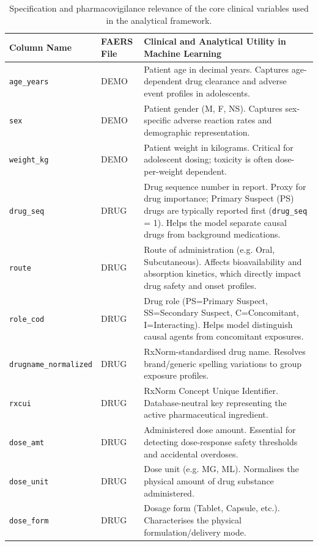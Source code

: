 \documentclass[10pt]{article}
\begin{document}
\begin{table}[htbp]
\caption{Specification and pharmacovigilance relevance of the core clinical variables used in the analytical framework.}
\label{tab:features_spec}
\centering\small\setlength{\tabcolsep}{8pt}
\begin{tabularx}{\textwidth}{|l|l|>{\raggedright\arraybackslash}X|}
\hline
\textbf{Column Name} &
\textbf{FAERS File} &
\textbf{Clinical and Analytical Utility in Machine Learning}\\
\hline
\texttt{age\_years} & DEMO & Patient age in decimal years. Captures age-dependent drug clearance and adverse event profiles in adolescents. \\
\hline
\texttt{sex} & DEMO & Patient gender (M, F, NS). Captures sex-specific adverse reaction rates and demographic representation. \\
\hline
\texttt{weight\_kg} & DEMO & Patient weight in kilograms. Critical for adolescent dosing; toxicity is often dose-per-weight dependent. \\
\hline
\texttt{drug\_seq} & DRUG & Drug sequence number in report. Proxy for drug importance; Primary Suspect (PS) drugs are typically reported first (\texttt{drug\_seq} = 1). Helps the model separate causal drugs from background medications. \\
\hline
\texttt{route} & DRUG & Route of administration (e.g. Oral, Subcutaneous). Affects bioavailability and absorption kinetics, which directly impact drug safety and onset profiles. \\
\hline
\texttt{role\_cod} & DRUG & Drug role (PS=Primary Suspect, SS=Secondary Suspect, C=Concomitant, I=Interacting). Helps model distinguish causal agents from concomitant exposures. \\
\hline
\texttt{drugname\_normalized} & DRUG & RxNorm-standardised drug name. Resolves brand/generic spelling variations to group exposure profiles. \\
\hline
\texttt{rxcui} & DRUG & RxNorm Concept Unique Identifier. Database-neutral key representing the active pharmaceutical ingredient. \\
\hline
\texttt{dose\_amt} & DRUG & Administered dose amount. Essential for detecting dose-response safety thresholds and accidental overdoses. \\
\hline
\texttt{dose\_unit} & DRUG & Dose unit (e.g. MG, ML). Normalises the physical amount of drug substance administered. \\
\hline
\texttt{dose\_form} & DRUG & Dosage form (Tablet, Capsule, etc.). Characterises the physical formulation/delivery mode. \\

\end{tabularx}
\end{table}
\end{document}
